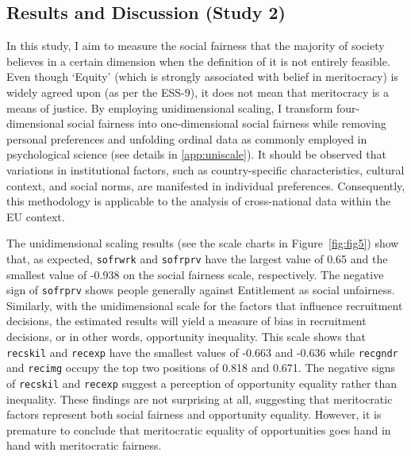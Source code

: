 \subsection{Results and Discussion (Study 2)}

In this study, I aim to measure the social fairness that the majority of society believes in a certain dimension when the definition of it is not entirely feasible. Even though ‘Equity’ (which is strongly associated with belief in meritocracy) is widely agreed upon (as per the ESS-9), it does not mean that meritocracy is a means of justice.
By employing unidimensional scaling, I transform four-dimensional social fairness into one-dimensional social fairness while removing personal preferences and unfolding ordinal data as commonly employed in psychological science (see details in \ref{app:uniscale}). It should be observed that variations in institutional factors, such as country-specific characteristics, cultural context, and social norms, are manifested in individual preferences. Consequently, this methodology is applicable to the analysis of cross-national data within the EU context.

The unidimensional scaling results (see the scale charts in Figure~\ref{fig:fig5}) show that, as expected, \texttt{sofrwrk} and \texttt{sofrprv} have the largest value of 0.65 and the smallest value of -0.938 on the social fairness scale, respectively. The negative sign of \texttt{sofrprv} shows people generally against Entitlement as social unfairness. Similarly, with the unidimensional scale for the factors that influence recruitment decisions, the estimated results will yield a measure of bias in recruitment decisions, or in other words, opportunity inequality. This scale shows that \texttt{recskil} and \texttt{recexp} have the smallest values of -0.663 and -0.636 while \texttt{recgndr} and \texttt{recimg} occupy the top two positions of 0.818 and 0.671. The negative signs of \texttt{recskil} and \texttt{recexp} suggest a perception of opportunity equality rather than inequality. These findings are not surprising at all, suggesting that meritocratic factors represent both social fairness and opportunity equality. However, it is premature to conclude that meritocratic equality of opportunities goes hand in hand with meritocratic fairness.

